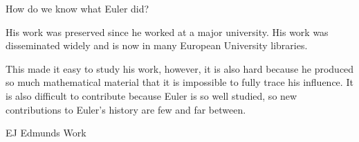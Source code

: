 \documentclass{report}
\begin{document}
\begin{description}
        \begin{center}
        \end{center}
        \begin{mdframed}
            How do we know what Euler did?
            \begin{mdframed}
                His work was preserved since he worked
                at a major university. His work was
                disseminated widely and is now in
                many European University libraries.
            \end{mdframed}
            \begin{mdframed}
                This made it easy to study his work,
                however, it is also hard because he produced
                so much mathematical material that it is impossible
                to fully trace his influence. It is also difficult
                to contribute because Euler is so well studied,
                so new contributions to Euler's history are few and
                far between.
            \end{mdframed}
        \end{mdframed}
    \item {\large EJ Edmunds Work}
        \begin{mdframed}
            
        \end{mdframed}
\end{description}
\end{document}
